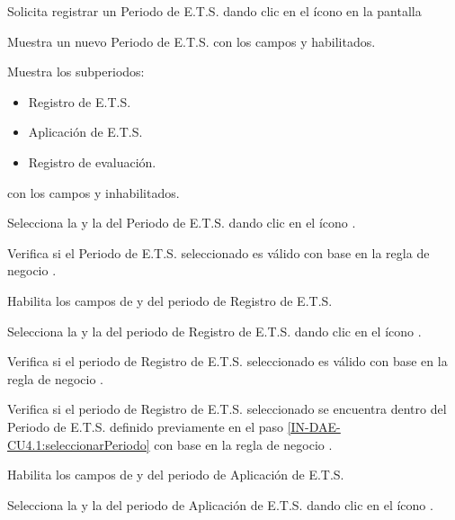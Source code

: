 \begin{UCtrayectoria}
	\UCpaso [\UCactor]  \label{IN-DAE-CU4.1:solicitarRegistrar}Solicita registrar un Periodo de E.T.S. dando clic en el ícono {\IUAdd} en la pantalla 
	
	\UCpaso Muestra un nuevo Periodo de E.T.S. con los campos   y  habilitados.
	
	\UCpaso Muestra los subperiodos:
		\begin{itemize}
			\item Registro de E.T.S.
			\item Aplicación de E.T.S.
			\item Registro de evaluación.
		\end{itemize}
	con los campos  y  inhabilitados.
	
	\UCpaso[\UCactor]  \label{IN-DAE-CU4.1:seleccionarPeriodo} Selecciona la  y la  del Periodo de E.T.S. dando clic en el ícono \IUCalendario. 
	
	\UCpaso Verifica si el Periodo de E.T.S. seleccionado es válido con base en la regla de negocio . 
	
	\UCpaso Habilita los campos de  y  del periodo de Registro de E.T.S.

	\UCpaso[\UCactor]  \label{IN-DAE-CU4.1:seleccionarRegistro}Selecciona la  y la  del periodo de Registro de E.T.S. dando clic en el ícono \IUCalendario.
	
	\UCpaso Verifica si el periodo de Registro de E.T.S. seleccionado es válido con base en la regla de negocio . 
	
	\UCpaso Verifica si el periodo de Registro de E.T.S. seleccionado se encuentra dentro del
	Periodo de E.T.S. definido previamente en el paso \ref{IN-DAE-CU4.1:seleccionarPeriodo} con base en la regla de negocio . 
	
	\UCpaso Habilita los campos de  y  del periodo de Aplicación de E.T.S.
	
	\UCpaso[\UCactor]  \label{IN-DAE-CU4.1:seleccionarAplicacion}Selecciona la  y la  del periodo de Aplicación de E.T.S. dando clic en el ícono \IUCalendario.
	

\end{UCtrayectoria}
